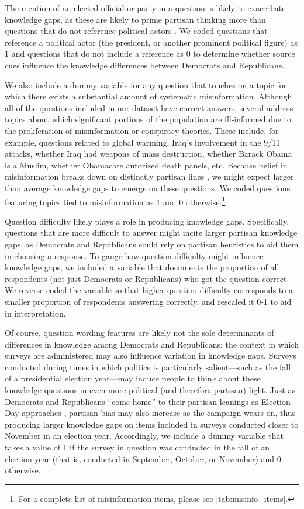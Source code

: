 \documentclass[12pt, letterpaper]{article}
\begin{document}
The mention of an elected official or party in a question is likely to exacerbate knowledge gaps, as these are likely to prime partisan thinking more than questions that do not reference political actors \citep[e.g.,][]{bisgaard_slothuus_2018,mondak_1993,Zaller1992}. We coded questions that reference a political actor (the president, or another prominent political figure) as 1 and questions that do not include a reference as 0 to determine whether source cues influence the knowledge differences between Democrats and Republicans.

We also include a dummy variable for any question that touches on a topic for which there exists a substantial amount of systematic misinformation. Although all of the questions included in our dataset have correct answers, several address topics about which significant portions of the population are ill-informed due to the proliferation of misinformation or conspiracy theories. These include, for example, questions related to global warming, Iraq's involvement in the 9/11 attacks, whether Iraq had weapons of mass destruction, whether Barack Obama is a Muslim, whether Obamacare autorized death panels, etc. Because belief in misinformation breaks down on distinctly partisan lines \citep{berinsky_2017,milleretal_2015,nyhan_2020}, we might expect larger than average knowledge gaps to emerge on these questions. We coded questions featuring topics tied to misinformation as 1 and 0 otherwise.\footnote{For a complete list of misinformation items, please see \ref{tab:misinfo_items}.}

Question difficulty likely plays a role in producing knowledge gaps. Specifically, questions that are more difficult to answer might incite larger partisan knowledge gaps, as Democrats and Republicans could rely on partisan heuristics to aid them in choosing a response. To gauge how question difficulty might influence knowledge gaps, we included a variable that documents the proportion of all respondents (not just Democrats or Republicans) who got the question correct. We reverse coded the variable so that higher question difficulty corresponds to a smaller proportion of respondents answering correctly, and rescaled it 0-1 to aid in interpretation. 

Of course, question wording features are likely not the sole determinants of differences in knowledge among Democrats and Republicans; the context in which surveys are administered may also influence variation in knowledge gaps. Surveys conducted during times in which politics is particularly salient---such as the fall of a presidential election year---may induce people to think about these knowledge questions in even more political (and therefore partisan) light. Just as Democrats and Republicans ``come home'' to their partisan leanings as Election Day approaches \citep{eriksonwlezien_2012,henderson_2015,sidesetal_2019,sidesvavreck_2013}, partisan bias may also increase as the campaign wears on, thus producing larger knowledge gaps on items included in surveys conducted closer to November in an election year. Accordingly, we include a dummy variable that takes a value of 1 if the survey in question was conducted in the fall of an election year (that is, conducted in September, October, or November) and 0 otherwise.
\end{document}
